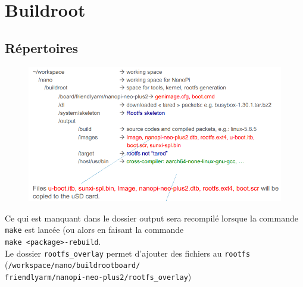 \documentclass[resume]{subfiles}
\begin{document}
\section{Buildroot}
\subsection{Répertoires}
\begin{figure}[H]
\centering
\includegraphics[width=0.9\columnwidth]{img_1.png}
\end{figure}
Ce qui est manquant dans le dossier output sera recompilé lorsque la commande \verb!make! est lancée (ou alors en faisant la commande\\
\verb!make <package>-rebuild!.\\
Le dossier \verb!rootfs_overlay! permet d'ajouter des fichiers au \verb!rootfs!\\
(\verb!/workspace/nano/buildrootboard/!\\
\verb!friendlyarm/nanopi-neo-plus2/rootfs_overlay!)
\end{document}
